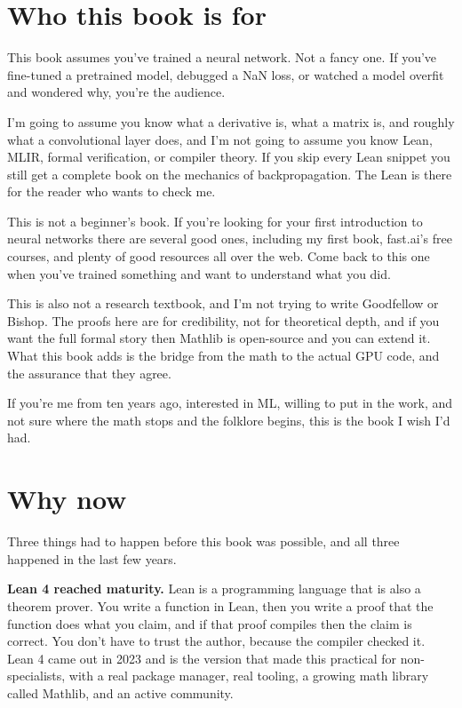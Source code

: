 \section*{Who this book is for}

This book assumes you've trained a neural network. Not a fancy one. If
you've fine-tuned a pretrained model, debugged a NaN loss, or watched a
model overfit and wondered why, you're the audience.

I'm going to assume you know what a derivative is, what a matrix is, and
roughly what a convolutional layer does, and I'm not going to assume you
know Lean, MLIR, formal verification, or compiler theory. If you skip
every Lean snippet you still get a complete book on the mechanics of
backpropagation. The Lean is there for the reader who wants to check me.

This is not a beginner's book. If you're looking for your first
introduction to neural networks there are several good ones, including my
first book, fast.ai's free courses, and plenty of good resources all
over the web. Come back to this one when you've trained something and want to
understand what you did.

This is also not a research textbook, and I'm not trying to write
Goodfellow or Bishop. The proofs here are for credibility, not for
theoretical depth, and if you want the full formal story then Mathlib is
open-source and you can extend it. What this book adds is the bridge from
the math to the actual GPU code, and the assurance that they agree.

If you're me from ten years ago, interested in ML, willing to put in the
work, and not sure where the math stops and the folklore begins, this is
the book I wish I'd had.

\section*{Why now}

Three things had to happen before this book was possible, and all three
happened in the last few years.

\textbf{Lean 4 reached maturity.} Lean is a programming language that is
also a theorem prover. You write a function in Lean, then you write a
proof that the function does what you claim, and if that proof compiles
then the claim is correct. You don't have to trust the author, because
the compiler checked it. Lean 4 came out in 2023 and is the version that
made this practical for non-specialists, with a real package manager,
real tooling, a growing math library called Mathlib, and an active
community.

